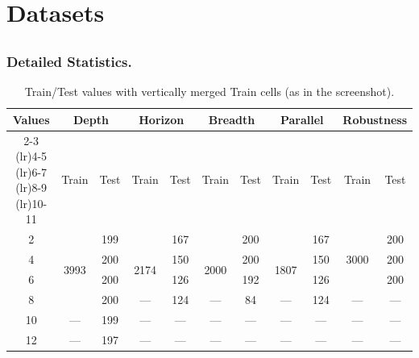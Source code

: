 \section{Datasets}
\label{ap:dataset_detail}


\subsection{\ourbenchmark}


\subsubsection{Detailed Statistics.}

\begin{table}[h]
\centering
\small
\setlength{\tabcolsep}{6pt}
\begin{tabular}{c cc cc cc cc cc}
\toprule
\multirow{2}{*}{\textbf{Values}}
& \multicolumn{2}{c}{\textbf{Depth}}
& \multicolumn{2}{c}{\textbf{Horizon}}
& \multicolumn{2}{c}{\textbf{Breadth}}
& \multicolumn{2}{c}{\textbf{Parallel}}
& \multicolumn{2}{c}{\textbf{Robustness}} \\
\cmidrule(lr){2-3}
\cmidrule(lr){4-5}
\cmidrule(lr){6-7}
\cmidrule(lr){8-9}
\cmidrule(lr){10-11}
& Train & Test
& Train & Test
& Train & Test
& Train & Test
& Train & Test \\
\midrule

2  & \multirow{4}{*}{3993} & 199
   &                    & 167
   &                    & 200
   &                    & 167
   & \multirow{3}{*}{3000} & 200 \\

4  &                      & 200
   & \multirow{2}{*}{2174} & 150
   & \multirow{2}{*}{2000} & 200
   & \multirow{2}{*}{1807} & 150
   &                      & 200 \\

6  &                      & 200
   &                      & 126
   &                      & 192
   &                      & 126
   &                      & 200 \\

8  &                      & 200
   & ---                  & 124
   & ---                  & 84
   & ---                  & 124
   & ---                  & --- \\

10 & ---                  & 199
   & ---                  & ---
   & ---                  & ---
   & ---                  & ---
   & ---                  & --- \\

12 & ---                  & 197
   & ---                  & ---
   & ---                  & ---
   & ---                  & ---
   & ---                  & --- \\

\bottomrule
\end{tabular}
\caption{Train/Test values with vertically merged Train cells (as in the screenshot).}
\label{tab:mas_axes_multirow}
\end{table}


